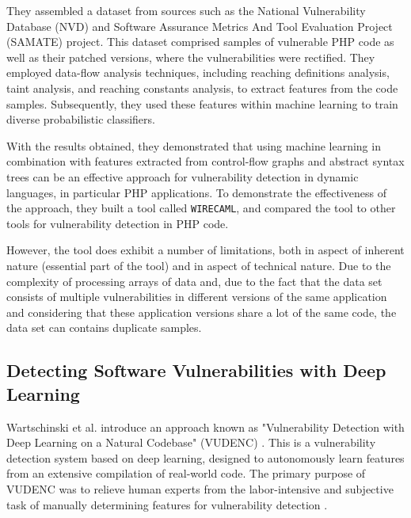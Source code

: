They assembled a dataset from sources such as the National Vulnerability Database (NVD) \cite{NVD2023} and Software Assurance Metrics And Tool Evaluation Project (SAMATE) \cite{SAMATE2023} project. This dataset comprised samples of vulnerable PHP code as well as their patched versions, where the vulnerabilities were rectified. They employed data-flow analysis techniques, including reaching definitions analysis, taint analysis, and reaching constants analysis, to extract features from the code samples. Subsequently, they used these features within machine learning to train diverse probabilistic classifiers.

With the results obtained, they demonstrated that using machine learning in combination with features extracted from control-flow graphs and abstract syntax trees can be an effective approach for vulnerability detection in dynamic languages, in particular PHP applications. To demonstrate the effectiveness of the approach, they built a tool called \texttt{WIRECAML}, and compared the tool to other tools for vulnerability detection in PHP code.

However, the tool does exhibit a number of limitations, both in aspect of inherent nature (essential part of the tool) and in aspect of technical nature. Due to the complexity of processing arrays of data and, due to the fact that the data set consists of multiple vulnerabilities in different versions of the same application and considering that these application versions share a lot of the same code, the data set can contains duplicate samples.



\subsection{Detecting Software Vulnerabilities with Deep Learning} %
\label{sec:	Detecting_Software_Vulnerabilities_with_Deep_Learning}

Wartschinski et al. introduce an approach known as "Vulnerability Detection with Deep Learning on a Natural Codebase" (VUDENC) \cite{Wartschinski2019}. This is a vulnerability detection system based on deep learning, designed to autonomously learn features from an extensive compilation of real-world code.
The primary purpose of VUDENC was to relieve human experts from the labor-intensive and subjective task of manually determining features for vulnerability detection \cite{Wartschinski2019}. 



